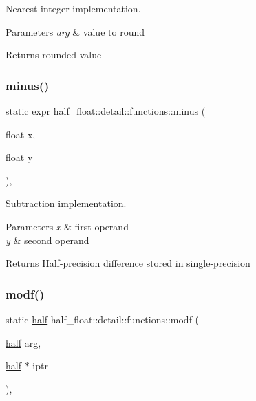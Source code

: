 Nearest integer implementation. 
\begin{DoxyParams}{Parameters}
{\em arg} & value to round \\
\hline
\end{DoxyParams}
\begin{DoxyReturn}{Returns}
rounded value 
\end{DoxyReturn}
\mbox{\label{structhalf__float_1_1detail_1_1functions_ad2d876e13910f4e95ea64161dc69d581}} 
\subsubsection{\texorpdfstring{minus()}{minus()}}
{\footnotesize\ttfamily static \hyperlink{structhalf__float_1_1detail_1_1expr}{expr} half\+\_\+float\+::detail\+::functions\+::minus (\begin{DoxyParamCaption}\item[{float}]{x,  }\item[{float}]{y }\end{DoxyParamCaption})\hspace{0.3cm}{\ttfamily [inline]}, {\ttfamily [static]}}

Subtraction implementation. 
\begin{DoxyParams}{Parameters}
{\em x} & first operand \\
\hline
{\em y} & second operand \\
\hline
\end{DoxyParams}
\begin{DoxyReturn}{Returns}
Half-\/precision difference stored in single-\/precision 
\end{DoxyReturn}
\mbox{\label{structhalf__float_1_1detail_1_1functions_a542863ae1da47122fa56b3665f7654f7}} 
\subsubsection{\texorpdfstring{modf()}{modf()}}
{\footnotesize\ttfamily static \hyperlink{classhalf__float_1_1half}{half} half\+\_\+float\+::detail\+::functions\+::modf (\begin{DoxyParamCaption}\item[{\hyperlink{classhalf__float_1_1half}{half}}]{arg,  }\item[{\hyperlink{classhalf__float_1_1half}{half} $\ast$}]{iptr }\end{DoxyParamCaption})\hspace{0.3cm}{\ttfamily [inline]}, {\ttfamily [static]}}

